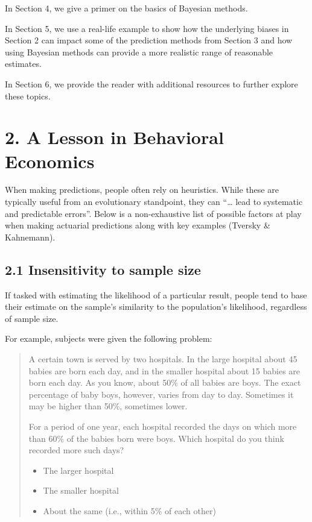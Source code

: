 \documentclass[
]{article}
\begin{document}
In Section 4, we give a primer on the basics of Bayesian methods.

In Section 5, we use a real-life example to show how the underlying
biases in Section 2 can impact some of the prediction methods from
Section 3 and how using Bayesian methods can provide a more realistic
range of reasonable estimates.

In Section 6, we provide the reader with additional resources to further
explore these topics.

\hypertarget{a-lesson-in-behavioral-economics}{%
\section{2. A Lesson in Behavioral
Economics}\label{a-lesson-in-behavioral-economics}}

When making predictions, people often rely on heuristics. While these
are typically useful from an evolutionary standpoint, they can
``\ldots{} lead to systematic and predictable errors''. Below is a
non-exhaustive list of possible factors at play when making actuarial
predictions along with key examples (Tversky \& Kahnemann).

\hypertarget{insensitivity-to-sample-size}{%
\subsection{2.1 Insensitivity to sample
size}\label{insensitivity-to-sample-size}}

If tasked with estimating the likelihood of a particular result, people
tend to base their estimate on the sample's similarity to the
population's likelihood, regardless of sample size.

For example, subjects were given the following problem:

\begin{quote}
A certain town is served by two hospitals. In the large hospital about
45 babies are born each day, and in the smaller hospital about 15 babies
are born each day. As you know, about 50\% of all babies are boys. The
exact percentage of baby boys, however, varies from day to day.
Sometimes it may be higher than 50\%, sometimes lower.

For a period of one year, each hospital recorded the days on which more
than 60\% of the babies born were boys. Which hospital do you think
recorded more such days?

\begin{itemize}
\item
  The larger hospital
\item
  The smaller hospital
\item
  About the same (i.e., within 5\% of each other)
\end{itemize}
\end{quote}
\end{document}

